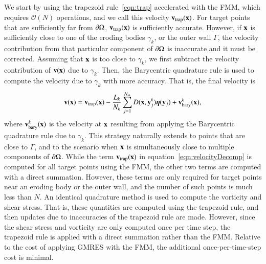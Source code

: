 \documentclass[preprint, 10pt]{elsarticle}
\begin{document}
We start by using the trapezoid rule~\eqref{eqn:trap} accelerated with
the FMM, which requires $\mathcal{O}(N)$ operations, and we call this
velocity ${\mathbf{v}}_{\mathrm{trap}}({\mathbf{x}})$.  For target points that are sufficiently far
from ${\partial}\Omega$, ${\mathbf{v}}_{\mathrm{trap}}({\mathbf{x}})$ is sufficiently accurate.  However,
if ${\mathbf{x}}$ is sufficiently close to one of the eroding bodies $\gamma_k$,
or the outer wall $\Gamma$, the velocity contribution from that
particular component of ${\partial}\Omega$ is inaccurate and it must be
corrected.  Assuming that ${\mathbf{x}}$ is too close to $\gamma_k$, we first
subtract the velocity contribution of ${\mathbf{v}}({\mathbf{x}})$ due to $\gamma_k$.
Then, the Barycentric quadrature rule is used to compute the velocity
due to $\gamma_k$ with more accuracy.  That is, the final velocity is
\begin{align}
  {\mathbf{v}}({\mathbf{x}}) = {\mathbf{v}}_{\mathrm{trap}}({\mathbf{x}}) - \frac{L_k}{N_k} \sum_{j=1}^{N_{\mathrm{in}}} 
    D({\mathbf{x}},{\mathbf{y}}^k_j) {\boldsymbol\eta}({\mathbf{y}}_j) + {\mathbf{v}}^k_{\mathrm{bary}}({\mathbf{x}}),
  \label{eqn:velocityDecomp}
\end{align}
where ${\mathbf{v}}^k_{\mathrm{bary}}({\mathbf{x}})$ is the velocity at ${\mathbf{x}}$ resulting from
applying the Barycentric quadrature rule due to $\gamma_k$.  This
strategy naturally extends to points that are close to $\Gamma$, and to
the scenario when ${\mathbf{x}}$ is simultaneously close to multiple components
of ${\partial}\Omega$.  While the term ${\mathbf{v}}_{\mathrm{trap}}({\mathbf{x}})$ in
equation~\eqref{eqn:velocityDecomp} is computed for all target points
using the FMM, the other two terms are computed with a direct summation.
However, these terms are only required for target points near an eroding
body or the outer wall, and the number of such points is much less than
$N$.  An identical quadrature method is used to compute the vorticity
and shear stress.  That is, these quantities are computed using the
trapezoid rule, and then updates due to inaccuracies of the trapezoid
rule are made.  However, since the shear stress and vorticity are only
computed once per time step, the trapezoid rule is applied with a direct
summation rather than the FMM.  Relative to the cost of applying GMRES
with the FMM, the additional once-per-time-step cost is minimal.
\end{document}
